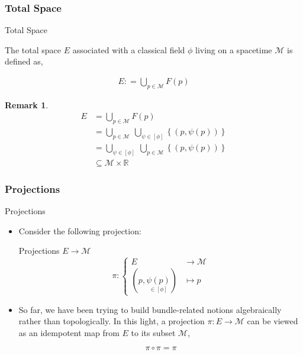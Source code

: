 \documentclass[9pt,handout]{beamer}
\newtheorem{remark}{Remark}
\begin{document}
\subsubsection{Total Space}
\begin{frame}{Total Space}
\begin{definition}
The total space $E$ associated with a classical field $\phi$ living on a spacetime $\mathcal{M}$ is defined as,

\begin{align*}
E : = \bigcup_{p \in \mathcal{M}} F \left( p \right)
\end{align*}
\end{definition}

\begin{remark}
\begin{align*}
E & = \bigcup_{p \in \mathcal{M}} F \left( p \right) \\
& = \bigcup_{p \in \mathcal{M}} \: \bigcup_{\psi \in \left[ \phi \right]} \left\{ \left( p, \psi \left( p \right) \right) \right\} \\
& = \bigcup_{\psi \in \left[ \phi \right]} \: \bigcup_{p \in \mathcal{M}} \left\{ \left( p, \psi \left( p \right) \right) \right\} \\
& \subseteq \mathcal{M} \times \mathbb{R}
\end{align*}
\end{remark}
\end{frame}

\subsubsection{Projections}
\begin{frame}{Projections}
\begin{itemize}
\item Consider the following projection:

\begin{block}{Projections $E \to \mathcal{M}$}
$$\pi : \begin{cases} E & \to \mathcal{M} \\ ( p, \underset{\in \left[ \phi \right]}{\psi \left( p \right)} ) & \mapsto p \end{cases}$$
\end{block}

\item So far, we have been trying to build bundle-related notions algebraically rather than topologically. In this light, a projection $\pi : E \to \mathcal{M}$ can be viewed as an idempotent map from $E$ to its subset $\mathcal{M}$,

$$\pi \circ \pi = \pi$$
\end{itemize}
\end{frame}
\end{document}
